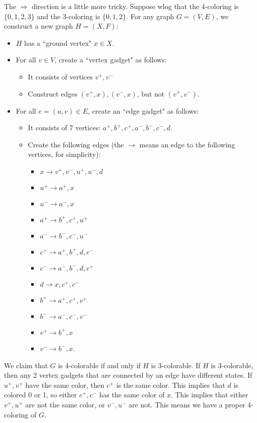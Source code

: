 \documentclass[10pt]{article}
\begin{document}
\begin{enumerate}
\par The $\Rightarrow$ direction is a little more tricky. Suppose wlog that the 4-coloring is $\{0, 1, 2, 3\}$ and the 3-coloring is $\{0, 1, 2\}$. For any graph $G = (V, E)$, we construct a new graph $H = (X, F)$:
\begin{itemize}
\item $H$ has a ``ground vertex" $x \in X$.
\item For all $v \in V$, create a ``vertex gadget" as follows:
\begin{itemize}
\item It consists of vertices $v^+, v^-$
\item Construct edges $(v^+, x), (v^-, x)$, but not $(v^+, v^-)$.
\end{itemize}
\item For all $e = (u, v) \in E$, create an ``edge gadget" as follows:
\begin{itemize}
\item It consists of 7 vertices: $a^+, b^+, c^+, a^-, b^-, c^-, d$. 
\item Create the following edges (the $\rightarrow$ means an edge to the following vertices, for simplicity):
\begin{itemize}
\item $x \rightarrow v^+, v^-, u^+, u^-, d$
\item $u^+ \rightarrow a^+, x$
\item $u^- \rightarrow a^-, x$
\item $a^+ \rightarrow b^+, c^+, u^+$
\item $a^- \rightarrow b^-, c^-, u^-$
\item $c^+ \rightarrow a^+, b^+, d, c^-$
\item $c^- \rightarrow a^-, b^-, d, c^+$
\item $d \rightarrow x, c^+, c^-$
\item $b^+ \rightarrow a^+, c^+, v^+$
\item $b^- \rightarrow a^-, c^-, v^-$
\item $v^+ \rightarrow b^+, x$
\item $v^- \rightarrow b^-, x$.
\end{itemize}
\end{itemize}
\end{itemize}
We claim that $G$ is 4-colorable if and only if $H$ is 3-colorable. If $H$ is 3-colorable, then any 2 vertex gadgets that are connected by an edge have different states. If $u^+, v^+$ have the same color, then $c^+$ is the same color. This implies that $d$ is colored 0 or 1, so either $c^+, c^-$ has the same color of $x$. This implies that either $v^+, u^+$ are not the same color, or $v^-, u^-$ are not. This means we have a proper 4-coloring of $G$.


\end{enumerate}
\end{document}

